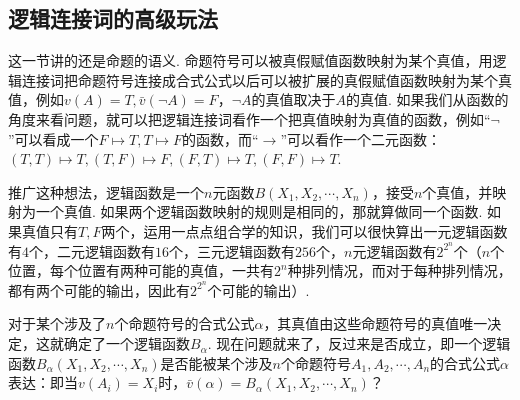 \documentclass[main.tex]{subfiles}
\begin{document}
\subsection{逻辑连接词的高级玩法}

这一节讲的还是命题的语义. 命题符号可以被真假赋值函数映射为某个真值，用逻辑连接词把命题符号连接成合式公式以后可以被扩展的真假赋值函数映射为某个真值，例如\(v(A)=T,\bar{v}(\neg A)=F\)，\(\neg A\)的真值取决于\(A\)的真值. 如果我们从函数的角度来看问题，就可以把逻辑连接词看作一个把真值映射为真值的函数，例如“\(\neg\)”可以看成一个\(F \mapsto T, T \mapsto F\)的函数，而“\(\to\)”可以看作一个二元函数：\((T,T) \mapsto T, (T,F) \mapsto F, (F,T) \mapsto T, (F,F) \mapsto T\). 

推广这种想法，逻辑函数是一个\(n\)元函数\(B(X_1, X_2, \cdots, X_n)\)，接受\(n\)个真值，并映射为一个真值. 如果两个逻辑函数映射的规则是相同的，那就算做同一个函数. 如果真值只有\(T,F\)两个，运用一点点组合学的知识，我们可以很快算出一元逻辑函数有\(4\)个，二元逻辑函数有\(16\)个，三元逻辑函数有\(256\)个，\(n\)元逻辑函数有\(2^{2^n}\)个（\(n\)个位置，每个位置有两种可能的真值，一共有\(2^n\)种排列情况，而对于每种排列情况，都有两个可能的输出，因此有\(2^{2^n}\)个可能的输出）. 

对于某个涉及了\(n\)个命题符号的合式公式\(\alpha\)，其真值由这些命题符号的真值唯一决定，这就确定了一个逻辑函数\(B_\alpha\). 现在问题就来了，反过来是否成立，即一个逻辑函数\(B_\alpha(X_1, X_2, \cdots, X_n)\)是否能被某个涉及\(n\)个命题符号\(A_1, A_2, \cdots, A_n\)的合式公式\(\alpha\)表达：即当\(v(A_i)=X_i\)时，\(\bar{v}(\alpha) = B_\alpha(X_1, X_2, \cdots, X_n)\)？
\end{document}
